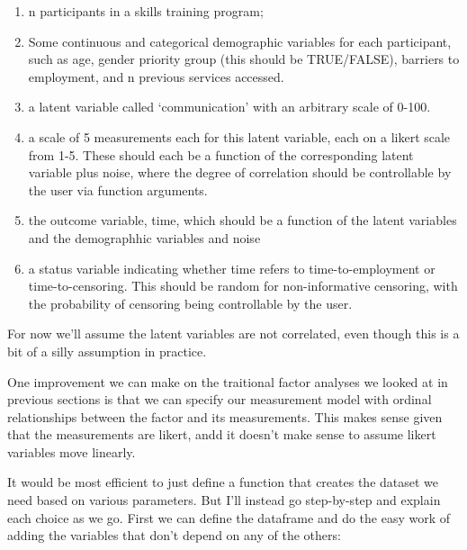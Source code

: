 \documentclass[
  letterpaper,
  DIV=11,
  numbers=noendperiod]{scrreprt}
\providecommand{\tightlist}{%
  \setlength{\itemsep}{0pt}\setlength{\parskip}{0pt}}\usepackage{longtable,booktabs,array}
\begin{document}
\begin{enumerate}
\def\labelenumi{\arabic{enumi}.}
\tightlist
\item
  n participants in a skills training program;
\item
  Some continuous and categorical demographic variables for each
  participant, such as age, gender priority group (this should be
  TRUE/FALSE), barriers to employment, and n previous services accessed.
\item
  a latent variable called `communication' with an arbitrary scale of
  0-100.
\item
  a scale of 5 measurements each for this latent variable, each on a
  likert scale from 1-5. These should each be a function of the
  corresponding latent variable plus noise, where the degree of
  correlation should be controllable by the user via function arguments.
\item
  the outcome variable, time, which should be a function of the latent
  variables and the demographhic variables and noise
\item
  a status variable indicating whether time refers to time-to-employment
  or time-to-censoring. This should be random for non-informative
  censoring, with the probability of censoring being controllable by the
  user.
\end{enumerate}

For now we'll assume the latent variables are not correlated, even
though this is a bit of a silly assumption in practice.

One improvement we can make on the traitional factor analyses we looked
at in previous sections is that we can specify our measurement model
with ordinal relationships between the factor and its measurements. This
makes sense given that the measurements are likert, andd it doesn't make
sense to assume likert variables move linearly.

It would be most efficient to just define a function that creates the
dataset we need based on various parameters. But I'll instead go
step-by-step and explain each choice as we go. First we can define the
dataframe and do the easy work of adding the variables that don't depend
on any of the others:
\end{document}
